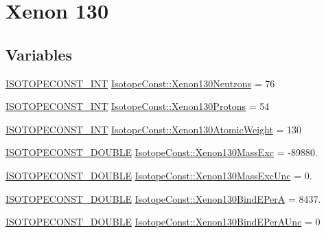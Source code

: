 \hypertarget{group___isotope_const-_xenon-_xe130}{}\section{Xenon 130}
\label{group___isotope_const-_xenon-_xe130}
\subsection*{Variables}
\begin{DoxyCompactItemize}
\item 
\mbox{\hyperlink{group___isotope_const-_macros_ga5f18360b3e99483a35c32d789e62621c}{I\+S\+O\+T\+O\+P\+E\+C\+O\+N\+S\+T\+\_\+\+I\+NT}} \mbox{\hyperlink{group___isotope_const-_xenon-_xe130_gabd54d73a015711b1d88b057bc0b231ec}{Isotope\+Const\+::\+Xenon130\+Neutrons}} = 76
\item 
\mbox{\hyperlink{group___isotope_const-_macros_ga5f18360b3e99483a35c32d789e62621c}{I\+S\+O\+T\+O\+P\+E\+C\+O\+N\+S\+T\+\_\+\+I\+NT}} \mbox{\hyperlink{group___isotope_const-_xenon-_xe130_gabbf7ae5bb56e6519dfed54e00f51deb8}{Isotope\+Const\+::\+Xenon130\+Protons}} = 54
\item 
\mbox{\hyperlink{group___isotope_const-_macros_ga5f18360b3e99483a35c32d789e62621c}{I\+S\+O\+T\+O\+P\+E\+C\+O\+N\+S\+T\+\_\+\+I\+NT}} \mbox{\hyperlink{group___isotope_const-_xenon-_xe130_ga55910dca858ce0fda7a6dcb129e7b866}{Isotope\+Const\+::\+Xenon130\+Atomic\+Weight}} = 130
\item 
\mbox{\hyperlink{group___isotope_const-_macros_ga8f45a7272ce02c0b4c65c44636ed719a}{I\+S\+O\+T\+O\+P\+E\+C\+O\+N\+S\+T\+\_\+\+D\+O\+U\+B\+LE}} \mbox{\hyperlink{group___isotope_const-_xenon-_xe130_gafc01d6e2a83baf663b254caa5e8188c4}{Isotope\+Const\+::\+Xenon130\+Mass\+Exc}} = -\/89880.
\item 
\mbox{\hyperlink{group___isotope_const-_macros_ga8f45a7272ce02c0b4c65c44636ed719a}{I\+S\+O\+T\+O\+P\+E\+C\+O\+N\+S\+T\+\_\+\+D\+O\+U\+B\+LE}} \mbox{\hyperlink{group___isotope_const-_xenon-_xe130_ga02e60ae66d0ada841e2d9b8beb86a6a3}{Isotope\+Const\+::\+Xenon130\+Mass\+Exc\+Unc}} = 0.
\item 
\mbox{\hyperlink{group___isotope_const-_macros_ga8f45a7272ce02c0b4c65c44636ed719a}{I\+S\+O\+T\+O\+P\+E\+C\+O\+N\+S\+T\+\_\+\+D\+O\+U\+B\+LE}} \mbox{\hyperlink{group___isotope_const-_xenon-_xe130_ga15d8f2e4a995058588e6d47825a6082e}{Isotope\+Const\+::\+Xenon130\+Bind\+E\+PerA}} = 8437.
\item 
\mbox{\hyperlink{group___isotope_const-_macros_ga8f45a7272ce02c0b4c65c44636ed719a}{I\+S\+O\+T\+O\+P\+E\+C\+O\+N\+S\+T\+\_\+\+D\+O\+U\+B\+LE}} \mbox{\hyperlink{group___isotope_const-_xenon-_xe130_gaef9f30c4e7c784ec15ae745352a1e38a}{Isotope\+Const\+::\+Xenon130\+Bind\+E\+Per\+A\+Unc}} = 0

\end{DoxyCompactItemize}

